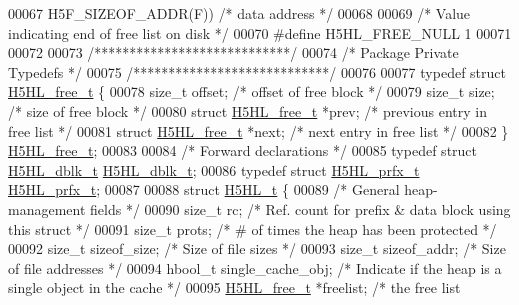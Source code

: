 \begin{DoxyCode}
00067 \textcolor{preprocessor}{        H5F\_SIZEOF\_ADDR(F))         }\textcolor{comment}{/* data address     */}\textcolor{preprocessor}{}
00068 
00069 \textcolor{comment}{/* Value indicating end of free list on disk */}
00070 \textcolor{preprocessor}{#define H5HL\_FREE\_NULL  1}
00071 
00072 
00073 \textcolor{comment}{/****************************/}
00074 \textcolor{comment}{/* Package Private Typedefs */}
00075 \textcolor{comment}{/****************************/}
00076 
00077 \textcolor{keyword}{typedef} \textcolor{keyword}{struct }\hyperlink{struct_h5_h_l__free__t}{H5HL\_free\_t} \{
00078     \textcolor{keywordtype}{size\_t}              offset;     \textcolor{comment}{/* offset of free block         */}
00079     \textcolor{keywordtype}{size\_t}              size;       \textcolor{comment}{/* size of free block           */}
00080     \textcolor{keyword}{struct }\hyperlink{struct_h5_h_l__free__t}{H5HL\_free\_t}  *prev;      \textcolor{comment}{/* previous entry in free list  */}
00081     \textcolor{keyword}{struct }\hyperlink{struct_h5_h_l__free__t}{H5HL\_free\_t}  *next;      \textcolor{comment}{/* next entry in free list      */}
00082 \} \hyperlink{struct_h5_h_l__free__t}{H5HL\_free\_t};
00083 
00084 \textcolor{comment}{/* Forward declarations */}
00085 \textcolor{keyword}{typedef} \textcolor{keyword}{struct }\hyperlink{struct_h5_h_l__dblk__t}{H5HL\_dblk\_t} \hyperlink{struct_h5_h_l__dblk__t}{H5HL\_dblk\_t};
00086 \textcolor{keyword}{typedef} \textcolor{keyword}{struct }\hyperlink{struct_h5_h_l__prfx__t}{H5HL\_prfx\_t} \hyperlink{struct_h5_h_l__prfx__t}{H5HL\_prfx\_t};
00087 
00088 \textcolor{keyword}{struct }\hyperlink{struct_h5_h_l__t}{H5HL\_t} \{
00089     \textcolor{comment}{/* General heap-management fields */}
00090     \textcolor{keywordtype}{size\_t}          rc;                 \textcolor{comment}{/* Ref. count for prefix & data block using this struct         */}
00091     \textcolor{keywordtype}{size\_t}          prots;              \textcolor{comment}{/* # of times the heap has been protected                       */}
00092     \textcolor{keywordtype}{size\_t}          sizeof\_size;        \textcolor{comment}{/* Size of file sizes                                           */}
00093     \textcolor{keywordtype}{size\_t}          sizeof\_addr;        \textcolor{comment}{/* Size of file addresses                                       */}
00094     hbool\_t         single\_cache\_obj;   \textcolor{comment}{/* Indicate if the heap is a single object in the cache         */}
00095     \hyperlink{struct_h5_h_l__free__t}{H5HL\_free\_t}     *freelist;          \textcolor{comment}{/* the free list                                        
}
\end{DoxyCode}
